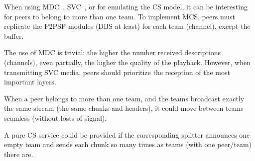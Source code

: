 
\label{sec:MCS}

When using MDC~\cite{baccichet2007content}, SVC~\cite{chu2009auction},
or for emulating the CS model, it can be interesting for peers to
belong to more than one team. To implement MCS, peers must replicate
the P2PSP modules (DBS at least) for each team (channel), except the
buffer.

The use of MDC is trivial: the higher the number received descriptions
(channels), even partially, the higher the quality of the
playback. However, when transmitting SVC media, peers should
prioritize the reception of the most important layers.

When a peer belongs to more than one team, and the teams broadcast exactly
the same stream (the same chunks and headers), it could move between
teams seamless (without losts of signal).

A pure CS service could be provided if the corresponding splitter
announces one empty team and sends each chunk so many times as teams
(with one peer/team) there are.
